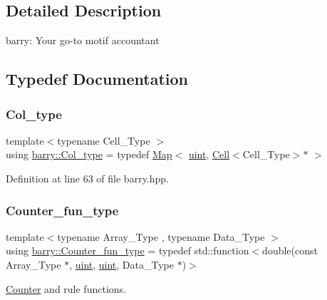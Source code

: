 \subsection{Detailed Description}
barry\+: Your go-\/to motif accountant 

\subsection{Typedef Documentation}
\mbox{\label{namespacebarry_ac328592ccff774bb3614f2cae43cffd7}} 
\subsubsection{\texorpdfstring{Col\+\_\+type}{Col\_type}}
{\footnotesize\ttfamily template$<$typename Cell\+\_\+\+Type $>$ \\
using \hyperlink{namespacebarry_ac328592ccff774bb3614f2cae43cffd7}{barry\+::\+Col\+\_\+type} = typedef \hyperlink{namespacebarry_a979a04835a9855ff2054c383c569c89e}{Map}$<$ \hyperlink{namespacebarry_a11dfc53ddb4672278319aa04f1e09a6c}{uint}, \hyperlink{classbarry_1_1_cell}{Cell}$<$Cell\+\_\+\+Type$>$$\ast$ $>$}



Definition at line 63 of file barry.\+hpp.

\mbox{\label{namespacebarry_abaaae3200da8e4b7faac3c04fe9c3081}} 
\subsubsection{\texorpdfstring{Counter\+\_\+fun\+\_\+type}{Counter\_fun\_type}}
{\footnotesize\ttfamily template$<$typename Array\+\_\+\+Type , typename Data\+\_\+\+Type $>$ \\
using \hyperlink{namespacebarry_abaaae3200da8e4b7faac3c04fe9c3081}{barry\+::\+Counter\+\_\+fun\+\_\+type} = typedef std\+::function$<$double(const Array\+\_\+\+Type $\ast$, \hyperlink{namespacebarry_a11dfc53ddb4672278319aa04f1e09a6c}{uint}, \hyperlink{namespacebarry_a11dfc53ddb4672278319aa04f1e09a6c}{uint}, Data\+\_\+\+Type $\ast$)$>$}



\hyperlink{classbarry_1_1_counter}{Counter} and rule functions. 


